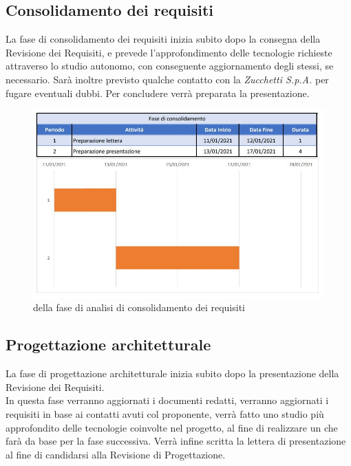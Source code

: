 \documentclass[../piano_di_progetto.tex]{subfiles}
\begin{document}
\subsection{Consolidamento dei requisiti}%
\label{sub:cons_req}
La fase di consolidamento dei requisiti inizia subito dopo la consegna della Revisione dei Requisiti, e prevede l’approfondimento delle tecnologie richieste attraverso lo studio autonomo, con conseguente aggiornamento degli stessi, se necessario. Sarà inoltre previsto qualche contatto con la \emph{Zucchetti S.p.A.} per fugare eventuali dubbi. Per concludere verrà preparata la presentazione. 
\begin{figure}[H]
\centering
\includegraphics[width=12cm]{componenti/img/fase_consolid}
\caption{  della fase di analisi di consolidamento dei requisiti}
\end{figure}

\subsection{Progettazione architetturale}%
\label{sub:prog_arc}
La fase di progettazione architetturale inizia subito dopo la presentazione della Revisione dei Requisiti.\\
In questa fase verranno aggiornati i documenti redatti, verranno aggiornati i requisiti in base ai contatti avuti col proponente, verrà fatto uno studio più approfondito delle tecnologie coinvolte nel progetto, al fine di realizzare un  che farà da base per la fase successiva. Verrà infine scritta la lettera di presentazione al fine di candidarsi alla Revisione di Progettazione.
\end{document}
